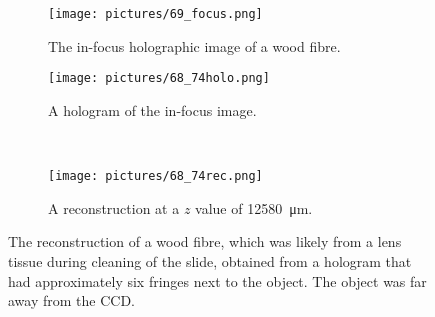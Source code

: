 \begin{figure}[ht!]
    \begin{center}

        \begin{subfigure}[t]{0.4\textwidth}
            \label{fig:69_focus}
            \texttt{[image: pictures/69\_focus.png]}
            \caption{The in-focus holographic image of a wood fibre.}
        \end{subfigure}
                \hspace*{\fill}
        \begin{subfigure}[t]{0.4\textwidth}
            \label{fig:68_74holo}
            \texttt{[image: pictures/68\_74holo.png]}
            \caption{A hologram of the in-focus image.}
        \end{subfigure}
        \\
        \begin{subfigure}[t]{\textwidth}
            \label{fig:68_74rec}
            \texttt{[image: pictures/68\_74rec.png]}
            \caption{A reconstruction at a $z$ value of
                \SI{12580}{\micro\meter}.}
        \end{subfigure}


    \end{center}
    \caption{%
        The reconstruction of a wood fibre, which was likely from a lens tissue
        during cleaning of the slide, obtained from a hologram that had
        approximately six fringes next to the object. The object was far away from
        the CCD.
    }%
    \label{fig:68_74}
\end{figure}



%
%
%


